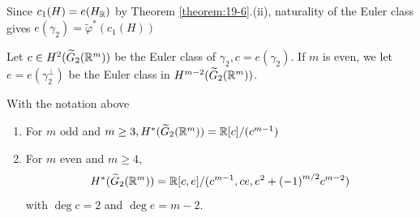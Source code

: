 Since ${c}_{1}( H)  = e( H_{{\mathbb{R}}})$ by Theorem \ref{theorem:19-6}.(ii), naturality of the Euler class 
gives $e( {\gamma }_{2})  = {\widetilde{\varphi }}^*( {{c}_{1}( H) })$

Let $c \in  H^{2}( {\widetilde{G}_{2}( {{\mathbb{R}}^m}) })$ be the Euler class of ${\gamma }_{2},c = e( {\gamma }_{2})$. 
If $m$ is even, we let $e = e(\gamma_{2}^\bot)$ be the Euler class in $H^{m-2}(\widetilde{G}_{2}({\mathbb{R}}^m))$.

\begin{theorem}\label{theorem:20-10}
  With the notation above
  \begin{enumerate}
    \item For $m$ odd and $m \geq  3,H^*( {\widetilde{G}_{2}( {{\mathbb{R}}^m}) })  = \mathbb{R}[  c]  /( {c}^{m- 1})$
    \item For $m$ even and $m \geq  4$,
      \[
        H^*( {\widetilde{G}_{2}( {{\mathbb{R}}^m}) })  = \mathbb{R}[  {c,e}]  /( {{c}^{m- 1},{ce},{e}^{2} + {(-1) }^{m/2}{c}^{m- 2}})
      \]
      with $\deg c = 2$ and $\deg e= m-2$.
  \end{enumerate}
\end{theorem}

